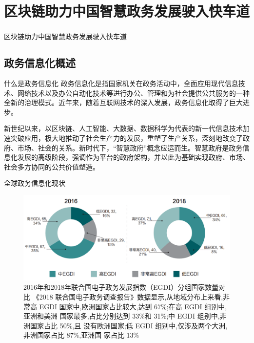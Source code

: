 \documentclass[11pt]{beamer}
\begin{document}
\section{区块链助力中国智慧政务发展驶入快车道}

\begin{frame}
	\frametitle{}
	{\Large 	区块链助力中国智慧政务发展驶入快车道}
\end{frame}

\subsection{政务信息化概述}
\begin{frame}{什么是政务信息化}
	政务信息化是指国家机关在政务活动中，全面应用现代信息技术、网络技术以及办公自动化技术等进行办公、管理和为社会提供公共服务的一种全新的治理模式。近年来，随着互联网技术的深入发展，政务信息化取得了巨大进步。

	新世纪以来，以区块链、人工智能、大数据、数据科学为代表的新一代信息技术加速突破应用，极大地推动了社会生产力的发展，重塑了生产关系，深刻地改变了政府、市场、社会的关系。新时代下，“智慧政府”概念应运而生。智慧政府是政务信息化发展的高级阶段，强调作为平台的政府架构，并以此为基础实现政府、市场、社会多方协同的公共价值塑造。
\end{frame}

\begin{frame}{全球政务信息化现状}
	\begin{figure}
		\centering
		\includegraphics[width=0.9\linewidth]{figures/gov/1}
		\caption{2016年和2018年联合国电子政务发展指数（EGDI）分组国家数量对比
		{\tiny 《2018 联合国电子政务调查报告》数据显示,从地域分布上来看,非常高
		EGDI 国家中,欧洲国家占比较大,达到 67\%;在高 EGDI 组别中,亚洲和美洲
		国家最多,占比分别达到 33\%和 31\%;中 EGDI 组别中,非洲国家占比 50\%,且
		没有欧洲国家;低 EGDI 组别中,仅涉及两个大洲,非洲国家占比 87\%,亚洲国
		家占比 13\%}}
		\label{fig:1}
	\end{figure}
\end{frame}
\end{document}
